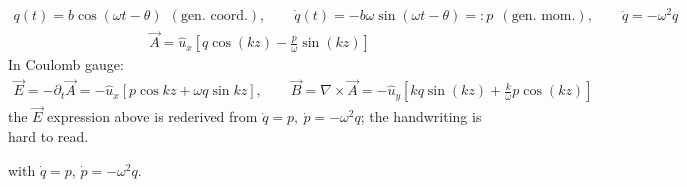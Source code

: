 \documentclass[letterpaper,10pt,english]{jupyterBook}
\begin{document}
\sphinxAtStartPar
{}
\begin{equation*}
\begin{split}
q(t)=b\cos(\omega t-\theta)\ \ (\text{gen. coord.}),\qquad
\dot q(t)=-b\omega\sin(\omega t-\theta)=:p\ \ (\text{gen. mom.}),\qquad
\ddot q=-\omega^2q
\end{split}
\end{equation*}\begin{equation*}
\begin{split}
\vec A=\hat u_x\left[q\cos(kz)-\frac{p}{\omega}\sin(kz)\right]
\end{split}
\end{equation*}
\sphinxAtStartPar
In Coulomb gauge:
\begin{equation*}
\begin{split}
\vec E=-\partial_t\vec A=-\hat u_x\left[p\cos kz+\omega q\sin kz\right],\qquad
\vec B=\nabla\times\vec A=-\hat u_y\left[kq\sin(kz)+\frac{k}{\omega}p\cos(kz)\right]
\end{split}
\end{equation*}
\sphinxAtStartPar
\sphinxstylestrong{{[}check{]}} the \(\vec E\) expression above is re\sphinxhyphen{}derived from \(\dot q=p,\ \dot p=-\omega^2q\); the handwriting is hard to read.

\sphinxAtStartPar
with \(\dot q=p\), \(\dot p=-\omega^2q\).
\end{document}
